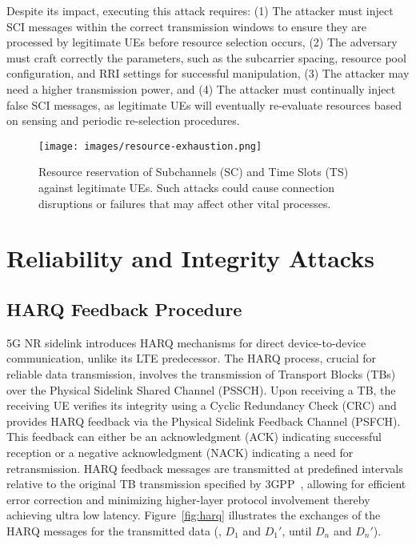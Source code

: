 Despite its impact, executing this attack requires: (1) The attacker must inject SCI messages within the correct transmission windows to ensure they are processed by legitimate UEs before resource selection occurs, (2) The adversary must craft correctly the parameters, such as the subcarrier spacing, resource pool configuration, and RRI settings for successful manipulation, (3) The attacker may need a higher transmission power, and (4) The attacker must continually inject false SCI messages, as legitimate UEs will eventually re-evaluate resources based on sensing and periodic re-selection procedures.

\begin{figure}[!t]
     \centering
     \texttt{[image: images/resource-exhaustion.png]}
     \caption{Resource reservation of Subchannels (SC) and Time Slots (TS) against legitimate UEs. Such attacks could cause connection disruptions or failures that may affect other vital processes.}
     \label{fig:resource-exhaustion}
\end{figure}

\section{Reliability and Integrity Attacks} \label{sec:harq}

\subsection{HARQ Feedback Procedure}

5G NR sidelink introduces HARQ mechanisms for direct device-to-device communication, unlike its LTE predecessor. The HARQ process, crucial for reliable data transmission, involves the transmission of Transport Blocks (TBs) over the Physical Sidelink Shared Channel (PSSCH). Upon receiving a TB, the receiving UE verifies its integrity using a Cyclic Redundancy Check (CRC) and provides HARQ feedback via the Physical Sidelink Feedback Channel (PSFCH). This feedback can either be an acknowledgment (ACK) indicating successful reception or a negative acknowledgment (NACK) indicating a need for retransmission. HARQ feedback messages are transmitted at predefined intervals relative to the original TB transmission specified by 3GPP~\cite{3gpp.38.213, 3gpp.38.321}, allowing for efficient error correction and minimizing higher-layer protocol involvement thereby achieving ultra low latency. Figure~\ref{fig:harq} illustrates the exchanges of the HARQ messages for the transmitted data (\ie, $D_1$ and $D_{1}'$, until $D_n$ and $D_{n}'$).

